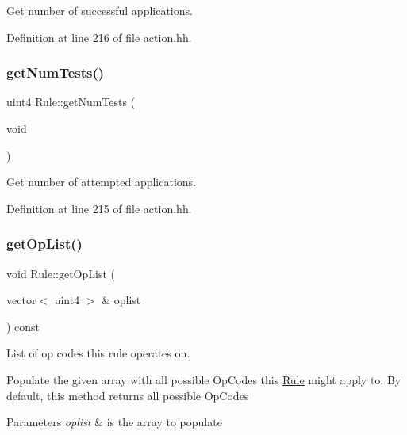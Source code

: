 Get number of successful applications. 



Definition at line 216 of file action.\+hh.

\mbox{\label{class_rule_a09a1d644210724868a0ad460dace9950}} 
\subsubsection{\texorpdfstring{getNumTests()}{getNumTests()}}
{\footnotesize\ttfamily uint4 Rule\+::get\+Num\+Tests (\begin{DoxyParamCaption}\item[{void}]{ }\end{DoxyParamCaption})\hspace{0.3cm}{\ttfamily [inline]}}



Get number of attempted applications. 



Definition at line 215 of file action.\+hh.

\mbox{\label{class_rule_a4023bfc7825de0ab866790551856d10e}} 
\subsubsection{\texorpdfstring{getOpList()}{getOpList()}}
{\footnotesize\ttfamily void Rule\+::get\+Op\+List (\begin{DoxyParamCaption}\item[{vector$<$ uint4 $>$ \&}]{oplist }\end{DoxyParamCaption}) const\hspace{0.3cm}{\ttfamily [virtual]}}



List of op codes this rule operates on. 

Populate the given array with all possible Op\+Codes this \mbox{\hyperlink{class_rule}{Rule}} might apply to. By default, this method returns all possible Op\+Codes 
\begin{DoxyParams}{Parameters}
{\em oplist} & is the array to populate \\
\hline
\end{DoxyParams}


